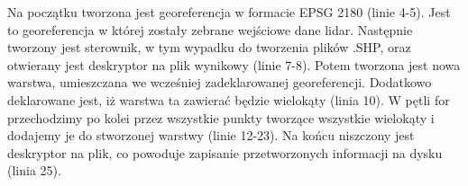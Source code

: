 Na początku tworzona jest georeferencja w formacie EPSG 2180 (linie 4-5). Jest to georeferencja w której zostały
zebrane wejściowe dane lidar. Następnie tworzony jest sterownik, w tym wypadku do tworzenia plików .SHP, oraz otwierany
jest deskryptor na plik wynikowy (linie 7-8). Potem tworzona jest nowa warstwa, umieszczana we wcześniej zadeklarowanej
georeferencji. Dodatkowo deklarowane jest, iż warstwa ta zawierać będzie wielokąty (linia 10). W pętli for przechodzimy po kolei
przez wszystkie punkty tworzące wszystkie wielokąty i dodajemy je do stworzonej warstwy (linie 12-23). Na końcu niszczony jest
deskryptor na plik, co powoduje zapisanie przetworzonych informacji na dysku (linia 25).
